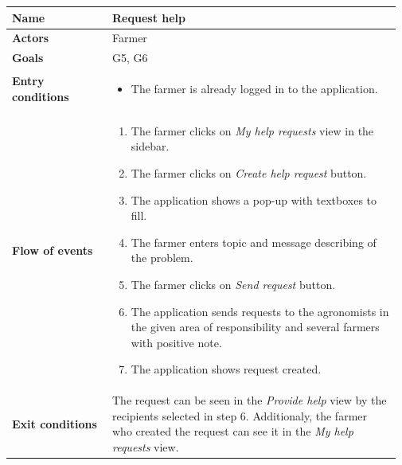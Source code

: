 \begin{table}[H]
    \centering
	\begin{tabular}{@{}p{0.25\linewidth} p{0.72\linewidth}@{}}
\toprule
		\textbf{Name}               & Request help\\
		\midrule
		\textbf{Actors}             & Farmer\\
		\midrule
		\textbf{Goals}              & G5, G6 \\
		\midrule
		
		\textbf{Entry conditions}   & \begin{itemize}[leftmargin=.4cm,noitemsep,topsep=0pt,before=\vspace{-3mm},after=\vspace{-4mm}]
		    \item The farmer is already logged in to the application.
		\end{itemize}\\
		\midrule
		
		\textbf{Flow of events}     & \begin{enumerate}[leftmargin=.4cm,noitemsep,topsep=0pt,before=\vspace{-3mm},after=\vspace{-4mm}]
		    \item The farmer clicks on \textit{My help requests} view in the sidebar.
		    \item The farmer clicks on \textit{Create help request} button.
		    \item The application shows a pop-up with textboxes to fill.
		    \item The farmer enters topic and message describing of the problem.
		    \item The farmer clicks on \textit{Send request} button.
		    \item The application sends requests to the agronomists in the given area of responsibility and several farmers with positive note. 
		    \item The application shows request created.
		\end{enumerate}\\
		\midrule
		\textbf{Exit conditions}    & The request can be seen in the \textit{Provide help} view by the recipients selected in step 6. Additionaly, the farmer who created the request can see it in the \textit{My help requests} view. \\
		\midrule
		

\end{tabular}
\end{table}
